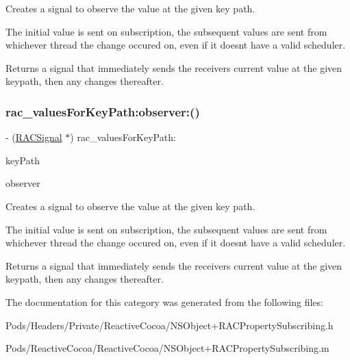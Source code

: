 Creates a signal to observe the value at the given key path.

The initial value is sent on subscription, the subsequent values are sent from whichever thread the change occured on, even if it doesn\textquotesingle{}t have a valid scheduler.

Returns a signal that immediately sends the receiver\textquotesingle{}s current value at the given keypath, then any changes thereafter. \mbox{\label{category_n_s_object_07_r_a_c_property_subscribing_08_aa2bf4263a7bab7e6d3223687806cfa4e}} 
\subsubsection{\texorpdfstring{rac\+\_\+values\+For\+Key\+Path\+:observer\+:()}{rac\_valuesForKeyPath:observer:()}\hspace{0.1cm}{\footnotesize\ttfamily [3/3]}}
{\footnotesize\ttfamily -\/ (\mbox{\hyperlink{interface_r_a_c_signal}{R\+A\+C\+Signal}} $\ast$) rac\+\_\+values\+For\+Key\+Path\+: \begin{DoxyParamCaption}\item[{(N\+S\+String $\ast$)}]{key\+Path }\item[{observer:(\+\_\+\+\_\+weak N\+S\+Object $\ast$)}]{observer }\end{DoxyParamCaption}}

Creates a signal to observe the value at the given key path.

The initial value is sent on subscription, the subsequent values are sent from whichever thread the change occured on, even if it doesn\textquotesingle{}t have a valid scheduler.

Returns a signal that immediately sends the receiver\textquotesingle{}s current value at the given keypath, then any changes thereafter. 

The documentation for this category was generated from the following files\+:\begin{DoxyCompactItemize}
\item 
Pods/\+Headers/\+Private/\+Reactive\+Cocoa/N\+S\+Object+\+R\+A\+C\+Property\+Subscribing.\+h\item 
Pods/\+Reactive\+Cocoa/\+Reactive\+Cocoa/N\+S\+Object+\+R\+A\+C\+Property\+Subscribing.\+m\end{DoxyCompactItemize}
